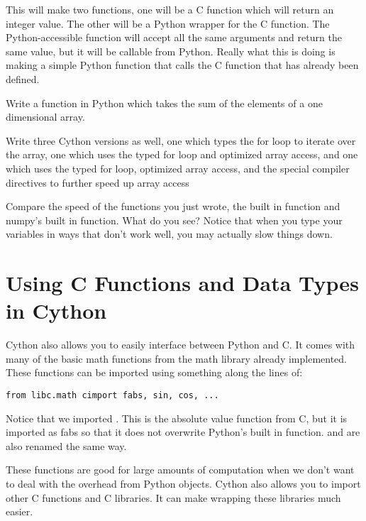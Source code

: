 This will make two functions, one will be a C function which will return an integer value.
The other will be a Python wrapper for the C function.
The Python-accessible function will accept all the same arguments and return the same value, but it will be callable from Python.
Really what this is doing is making a simple Python function that calls the C function that has already been defined.

\begin{problem}

Write a function in Python which takes the sum of the elements of a one dimensional array.

Write three Cython versions as well, one which types the for loop to iterate over the array, one which uses the typed for loop and optimized array access, and one which uses the typed for loop, optimized array access, and the special compiler directives to further speed up array access

Compare the speed of the functions you just wrote, the built in  function and numpy's built in  function.
What do you see?
Notice that when you type your variables in ways that don't work well, you may actually slow things down.

\end{problem}

\section*{Using C Functions and Data Types in Cython}

Cython also allows you to easily interface between Python and C.
It comes with many of the basic math functions from the math library already implemented.
These functions can be imported using something along the lines of:
\begin{lstlisting}
from libc.math cimport fabs, sin, cos, ...
\end{lstlisting}

Notice that we imported .
This is the absolute value function from C, but it is imported as fabs so that it does not overwrite Python's built in  function. 
 and  are also renamed the same way.

These functions are good for large amounts of computation when we don't want to deal with the overhead from Python objects.
Cython also allows you to import other C functions and C libraries.
It can make wrapping these libraries much easier.

